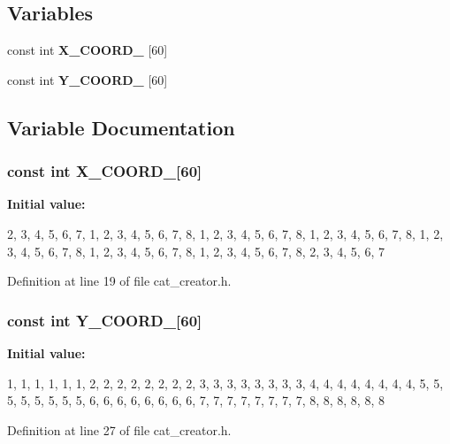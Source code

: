 \subsection*{\-Variables}
\begin{DoxyCompactItemize}
\item 
const int {\bf \-X\-\_\-\-C\-O\-O\-R\-D\-\_\-} [60]
\item 
const int {\bf \-Y\-\_\-\-C\-O\-O\-R\-D\-\_\-} [60]
\end{DoxyCompactItemize}


\subsection{\-Variable \-Documentation}
\subsubsection[{\-X\-\_\-\-C\-O\-O\-R\-D\-\_\-}]{\setlength{\rightskip}{0pt plus 5cm}const int {\bf \-X\-\_\-\-C\-O\-O\-R\-D\-\_\-}[60]}\label{cat__creator_8h_ab5f3225d11c3b94b559538383626bc05}
{\bfseries \-Initial value\-:}
\begin{DoxyCode}
 {    2, 3, 4, 5, 6, 7,
                           1, 2, 3, 4, 5, 6, 7, 8,
                           1, 2, 3, 4, 5, 6, 7, 8,
                           1, 2, 3, 4, 5, 6, 7, 8,
                           1, 2, 3, 4, 5, 6, 7, 8,
                           1, 2, 3, 4, 5, 6, 7, 8,
                           1, 2, 3, 4, 5, 6, 7, 8,
                              2, 3, 4, 5, 6, 7     }
\end{DoxyCode}


\-Definition at line 19 of file cat\-\_\-creator.\-h.

\subsubsection[{\-Y\-\_\-\-C\-O\-O\-R\-D\-\_\-}]{\setlength{\rightskip}{0pt plus 5cm}const int {\bf \-Y\-\_\-\-C\-O\-O\-R\-D\-\_\-}[60]}\label{cat__creator_8h_ad4453466899bf6e878072903395b2a1d}
{\bfseries \-Initial value\-:}
\begin{DoxyCode}
 {    1, 1, 1, 1, 1, 1,
                           2, 2, 2, 2, 2, 2, 2, 2,
                           3, 3, 3, 3, 3, 3, 3, 3,
                           4, 4, 4, 4, 4, 4, 4, 4,
                           5, 5, 5, 5, 5, 5, 5, 5,
                           6, 6, 6, 6, 6, 6, 6, 6,
                           7, 7, 7, 7, 7, 7, 7, 7,
                              8, 8, 8, 8, 8, 8    }
\end{DoxyCode}


\-Definition at line 27 of file cat\-\_\-creator.\-h.

